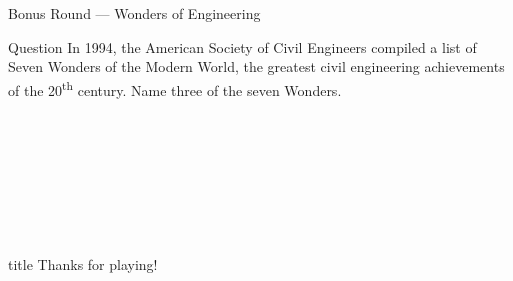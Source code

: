 \documentclass[11pt]{beamer}
\begin{document}
\begin{frame}[t]{Bonus Round --- Wonders of Engineering}
    \vspace{-0.5em}
    \begin{block}{Question}
        In 1994, the American Society of Civil Engineers compiled a list of Seven Wonders of the Modern World, the greatest civil engineering achievements of the 20\textsuperscript{th} century. Name three of the seven Wonders.
    \end{block}
\end{frame}
\section*{\ }
\subsection*{\ }
\begingroup{}
\begin{frame}
    \vfill{}
    \centering{}
    \begin{beamercolorbox}[sep=8pt,center,shadow=true,rounded=true]{title}
        Thanks for playing!\par%
    \end{beamercolorbox}
    \vfill{}
\end{frame}
\endgroup{}
\end{document}
